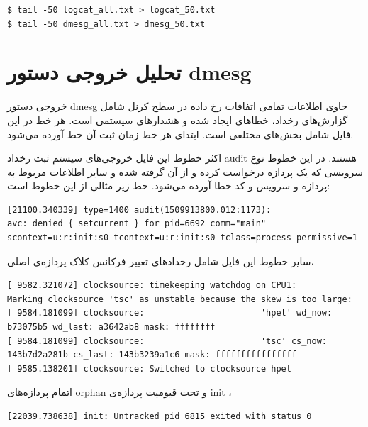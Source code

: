 \documentclass{article}
\begin{document}
\begin{latin}
\begin{verbatim}
$ tail -50 logcat_all.txt > logcat_50.txt
$ tail -50 dmesg_all.txt > dmesg_50.txt
\end{verbatim}
\end{latin}

\section*{تحلیل خروجی دستور dmesg}
خروجی دستور dmesg حاوی اطلاعات تمامی اتفاقات رخ داده در سطح کرنل شامل گزارش‌های رخداد، خطا‌های ایجاد شده و هشدار‌های سیستمی است. هر خط در این فایل شامل بخش‌های مختلفی است. ابتدای هر خط  زمان ثبت آن خط آورده می‌شود.

اکثر خطوط این فایل خروجی‌های سیستم ثبت رخداد audit هستند. در این خطوط نوع سرویسی که یک پردازه درخواست کرده و از آن گرفته شده و سایر اطلاعات مربوط به پردازه و سرویس و کد خطا آورده می‌شود. خط زیر مثالی از این خطوط است:

\begin{latin}
\begin{verbatim}
[21100.340339] type=1400 audit(1509913800.012:1173):
avc: denied { setcurrent } for pid=6692 comm="main"
scontext=u:r:init:s0 tcontext=u:r:init:s0 tclass=process permissive=1
\end{verbatim}
\end{latin}

سایر خطوط این فایل شامل رخداد‌های تغییر فرکانس کلاک پردازه‌ی اصلی،

\begin{latin}
\begin{verbatim}
[ 9582.321072] clocksource: timekeeping watchdog on CPU1:
Marking clocksource 'tsc' as unstable because the skew is too large:
[ 9584.181099] clocksource:                       'hpet' wd_now:
b73075b5 wd_last: a3642ab8 mask: ffffffff
[ 9584.181099] clocksource:                       'tsc' cs_now:
143b7d2a281b cs_last: 143b3239a1c6 mask: ffffffffffffffff
[ 9585.138201] clocksource: Switched to clocksource hpet
\end{verbatim}
\end{latin}
اتمام پردازه‌های orphan و تحت قیومیت پردازه‌ی init
،
\begin{latin}
\begin{verbatim}
[22039.738638] init: Untracked pid 6815 exited with status 0
\end{verbatim}
\end{latin}
\end{document}

